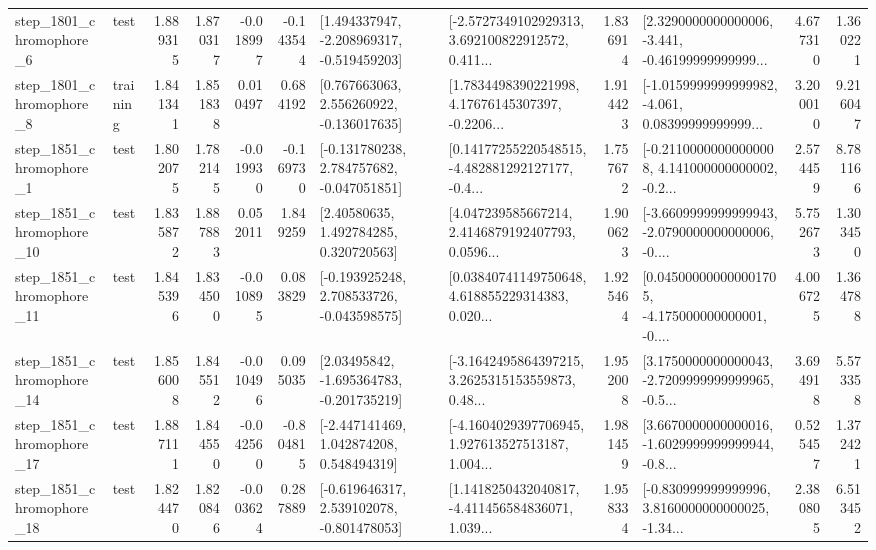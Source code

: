 \begin{tabular}{llrrrrllrlrr}
  step\_1801\_chromophore\_6 &      test &      1.889315 &    1.870317 &     -0.018997 & -0.143544 &   [1.494337947, -2.208969317, -0.519459203] &  [-2.5727349102929313, 3.692100822912572, 0.411... &       1.836914 &  [2.3290000000000006, -3.441, -0.46199999999999... &            4.677310 &          1.360221 \\
  step\_1801\_chromophore\_8 &  training &      1.841341 &    1.851838 &      0.010497 &  0.684192 &    [0.767663063, 2.556260922, -0.136017635] &  [1.7834498390221998, 4.17676145307397, -0.2206... &       1.914423 &  [-1.0159999999999982, -4.061, 0.08399999999999... &            3.200010 &          9.216047 \\
  step\_1851\_chromophore\_1 &      test &      1.802075 &    1.782145 &     -0.019930 & -0.169730 &   [-0.131780238, 2.784757682, -0.047051851] &  [0.14177255220548515, -4.482881292127177, -0.4... &       1.757672 &  [-0.21100000000000008, 4.141000000000002, -0.2... &            2.574459 &          8.781166 \\
 step\_1851\_chromophore\_10 &      test &      1.835872 &    1.887883 &      0.052011 &  1.849259 &      [2.40580635, 1.492784285, 0.320720563] &  [4.047239585667214, 2.4146879192407793, 0.0596... &       1.900623 &  [-3.6609999999999943, -2.0790000000000006, -0.... &            5.752673 &          1.303450 \\
 step\_1851\_chromophore\_11 &      test &      1.845396 &    1.834500 &     -0.010895 &  0.083829 &   [-0.193925248, 2.708533726, -0.043598575] &  [0.03840741149750648, 4.618855229314383, 0.020... &       1.925464 &  [0.045000000000001705, -4.175000000000001, -0.... &            4.006725 &          1.364788 \\
 step\_1851\_chromophore\_14 &      test &      1.856008 &    1.845512 &     -0.010496 &  0.095035 &    [2.03495842, -1.695364783, -0.201735219] &  [-3.1642495864397215, 3.2625315153559873, 0.48... &       1.952008 &  [3.1750000000000043, -2.7209999999999965, -0.5... &            3.694918 &          5.573358 \\
 step\_1851\_chromophore\_17 &      test &      1.887111 &    1.844550 &     -0.042560 & -0.804815 &    [-2.447141469, 1.042874208, 0.548494319] &  [-4.1604029397706945, 1.927613527513187, 1.004... &       1.981459 &  [3.6670000000000016, -1.6029999999999944, -0.8... &            0.525457 &          1.372421 \\
 step\_1851\_chromophore\_18 &      test &      1.824470 &    1.820846 &     -0.003624 &  0.287889 &   [-0.619646317, 2.539102078, -0.801478053] &  [1.1418250432040817, -4.411456584836071, 1.039... &       1.958334 &  [-0.830999999999996, 3.8160000000000025, -1.34... &            2.380805 &          6.513452 \\

\end{tabular}
